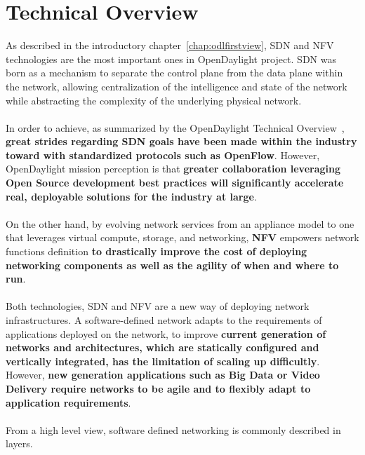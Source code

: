 \documentclass[a4paper, 12pt]{book}
\begin{document}
\section{Technical Overview}
\label{chap:odltech_overview}

As described in the introductory chapter~\ref{chap:odlfirstview}, SDN and NFV technologies are the most important ones in OpenDaylight project. SDN was born as a mechanism to separate the control plane from the data plane within the network, allowing centralization of the intelligence and state of the network while abstracting the complexity of the underlying physical network.\\
\\
In order to achieve, as summarized by the OpenDaylight Technical Overview~\cite{OpenDaylightTechOverview}, \textbf{great strides regarding SDN goals have been made within the industry toward with standardized protocols such as OpenFlow}. However, OpenDaylight mission perception is that \textbf{greater collaboration leveraging Open Source development best practices will significantly accelerate real, deployable solutions for the industry at large}.\\
\\
On the other hand, by evolving network services from an appliance model to one that leverages virtual compute, storage, and networking, \textbf{NFV} empowers network functions definition \textbf{to drastically improve the cost of deploying networking components as well as the agility of when and where to run}.\\
\\
Both technologies, SDN and NFV are a new way of deploying network infrastructures. A software-defined network adapts to the requirements of applications deployed on the network, to improve \textbf{current generation of networks and architectures, which are statically configured and vertically integrated, has the limitation of scaling up difficultly}. However, \textbf{new generation applications such as Big Data or Video Delivery require networks to be agile and to flexibly adapt to application requirements}.\\
\\
From a high level view, software defined networking is commonly described in layers.
\end{document}

